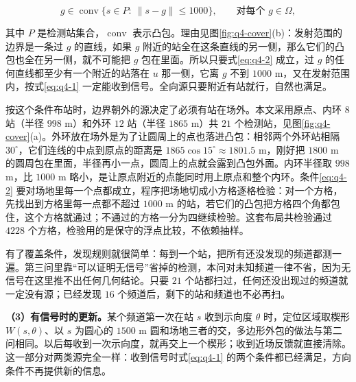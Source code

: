 \begin{equation}\label{eq:q4-2}
g\in\operatorname{conv}\{s\in P:\ \|s-g\|\le1000\},\qquad\text{对每个 } g\in\Omega ,
\end{equation}

其中 $P$ 是检测站集合，$\operatorname{conv}$ 表示凸包。理由见图\ref{fig:q4-cover}(b)：发射范围的边界是一条过 $g$ 的直线，如果 $g$ 附近的站全在这条直线的另一侧，那么它们的凸包也全在另一侧，就不可能把 $g$ 包在里面。所以只要式\eqref{eq:q4-2} 成立，过 $g$ 的任何直线都至少有一个附近的站落在 $u$ 那一侧，它离 $g$ 不到 $1000$ m，又在发射范围内，按式\eqref{eq:q4-1} 一定能收到信号。全向源只要附近有站就行，自然也满足。

按这个条件布站时，边界朝外的源决定了必须有站在场外。本文采用原点、内环 $8$ 站（半径 $998$ m）和外环 $12$ 站（半径 $1865$ m）共 $21$ 个检测站，见图\ref{fig:q4-cover}(a)。外环放在场外是为了让圆周上的点也落进凸包：相邻两个外环站相隔 $30^\circ$，它们连线的中点到原点的距离是 $1865\cos15^\circ\approx1801.5$ m，刚好把 $1800$ m 的圆周包在里面，半径再小一点，圆周上的点就会露到凸包外面。内环半径取 $998$ m，比 $1000$ m 略小，是让原点附近的点能同时用上原点和整个内环。条件\eqref{eq:q4-2} 要对场地里每一个点都成立，程序把场地切成小方格逐格检验：对一个方格，先找出到方格里每一点都不超过 $1000$ m 的站，若它们的凸包把方格四个角都包住，这个方格就通过；不通过的方格一分为四继续检验。这套布局共检验通过 $4228$ 个方格，检验用的是保守的浮点比较，不依赖抽样。

有了覆盖条件，发现规则就很简单：每到一个站，把所有还没发现的频道都测一遍。第三问里靠“可以证明无信号”省掉的检测，本问对未知频道一律不省，因为无信号在这里推不出任何几何结论。只要 $21$ 个站都扫过，任何还没出现过的频道就一定没有源；已经发现 $16$ 个频道后，剩下的站和频道也不必再扫。

\begin{center}
\begin{minipage}{\linewidth}
\centering
\QFourCoverageFigure
{}
\label{fig:q4-cover}
\end{minipage}
\end{center}

\textbf{（3）有信号时的更新。}某个频道第一次在站 $s$ 收到示向度 $\theta$ 时，定位区域取楔形 $W(s,\theta)$、以 $s$ 为圆心的 $1500$ m 圆和场地三者的交，多边形外包的做法与第二问相同。以后每收到一次示向度，就再交上一个楔形；收到近场反馈就直接清除。这一部分对两类源完全一样：收到信号时式\eqref{eq:q4-1} 的两个条件都已经满足，方向条件不再提供新的信息。

